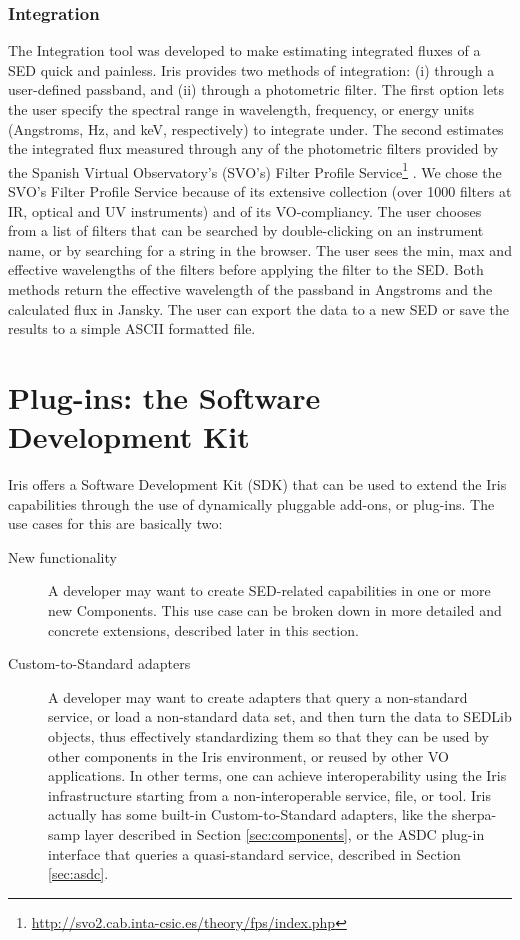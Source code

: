 \documentclass[final,5p,authoryear]{elsarticle}
\begin{document}
\subsubsection{Integration} The Integration tool was developed to make
estimating integrated fluxes of a SED quick and painless. Iris provides two
methods of integration: (i) through a user-defined passband, and (ii) through a
photometric filter. The first option lets the user specify the spectral range in
wavelength, frequency, or energy units (Angstroms, Hz, and keV, respectively) to
integrate under. The second estimates the integrated flux measured through any
of the photometric filters provided by the Spanish Virtual Observatory's (SVO's)
Filter Profile
Service\footnote{\url{http://svo2.cab.inta-csic.es/theory/fps/index.php}}
\citep{2013arXiv1312.3249S}. We chose the SVO's Filter Profile Service because
of its extensive collection (over 1000 filters at IR, optical and UV
instruments) and of its VO-compliancy. The user chooses from a list of filters
that can be searched by double-clicking on an instrument name, or by searching
for a string in the browser. The user sees the min, max and effective
wavelengths of the filters before applying the filter to the SED.
Both methods return the effective wavelength of the passband in Angstroms and
the calculated flux in Jansky. The user can export the data to a new SED or
save the results to a simple ASCII formatted file.

\section{Plug-ins: the Software Development Kit} \label{sec:plugins}

Iris offers a Software Development Kit (SDK) that can be used to extend the Iris
capabilities through the use of dynamically pluggable add-ons, or plug-ins.  The
use cases for this are basically two: \begin{description} \item[New
functionality] A developer may want to create SED-related capabilities in one or
more new Components. This use case can be broken down in more detailed and
concrete extensions, described later in this section.  \item[Custom-to-Standard
adapters] A developer may want to create adapters that query a non-standard
service, or load a non-standard data set, and then turn the data to SEDLib
objects, thus effectively standardizing them so that they can be used by other
components in the Iris environment, or reused by other VO applications. In other
terms, one can achieve interoperability using the Iris infrastructure starting
from a non-interoperable service, file, or tool. Iris actually has some built-in
Custom-to-Standard adapters, like the sherpa-samp layer described in Section
\ref{sec:components}, or the ASDC plug-in interface that queries a
quasi-standard service, described in Section \ref{sec:asdc}.  \end{description}
\end{document}
